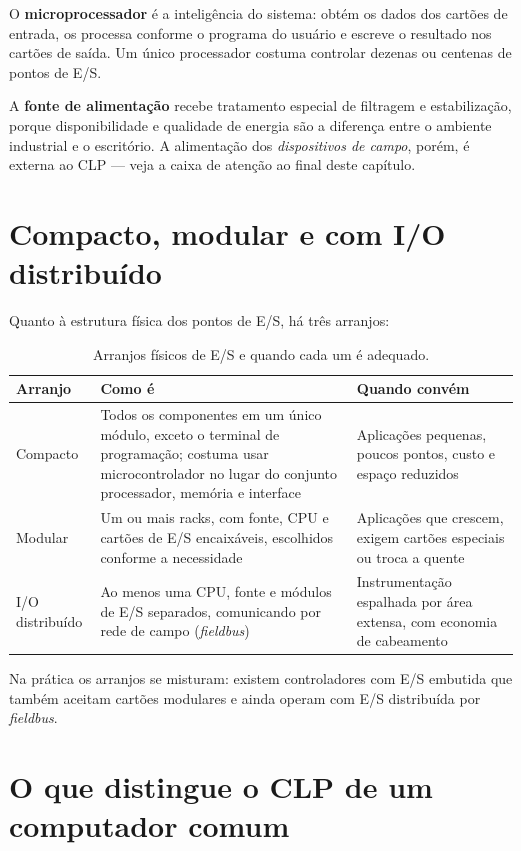 O \textbf{microprocessador} é a inteligência do sistema: obtém os dados dos cartões de entrada, os
processa conforme o programa do usuário e escreve o resultado nos cartões de saída. Um único
processador costuma controlar dezenas ou centenas de pontos de E/S.

A \textbf{fonte de alimentação} recebe tratamento especial de filtragem e estabilização, porque
disponibilidade e qualidade de energia são a diferença entre o ambiente industrial e o escritório. A
alimentação dos \emph{dispositivos de campo}, porém, é externa ao CLP --- veja a caixa de atenção ao
final deste capítulo.

\section{Compacto, modular e com I/O distribuído}

Quanto à estrutura física dos pontos de E/S, há três arranjos:

\begin{table}[H]
  \centering
  \caption{Arranjos físicos de E/S e quando cada um é adequado.}
  \label{tab:arranjos-es}
  \begin{tabular}{p{3.2cm} p{6.0cm} p{5.4cm}}
    \toprule
    Arranjo & Como é & Quando convém \\
    \midrule
    Compacto
      & Todos os componentes em um único módulo, exceto o terminal de programação; costuma usar
        microcontrolador no lugar do conjunto processador, memória e interface
      & Aplicações pequenas, poucos pontos, custo e espaço reduzidos \\
    Modular
      & Um ou mais racks, com fonte, CPU e cartões de E/S encaixáveis, escolhidos conforme a
        necessidade
      & Aplicações que crescem, exigem cartões especiais ou troca a quente \\
    I/O distribuído
      & Ao menos uma CPU, fonte e módulos de E/S separados, comunicando por rede de campo
        (\emph{fieldbus})
      & Instrumentação espalhada por área extensa, com economia de cabeamento \\
    \bottomrule
  \end{tabular}
\end{table}

Na prática os arranjos se misturam: existem controladores com E/S embutida que também aceitam cartões
modulares e ainda operam com E/S distribuída por \emph{fieldbus}.

\section{O que distingue o CLP de um computador comum}


